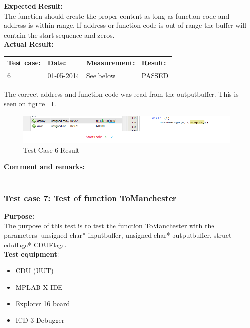 \textbf{Expected Result:}\\
The function should create the proper content as long as function code and address is within range. If address or function code is out of range the buffer will contain the start sequence and zeros.\\

\textbf{Actual Result:}\\
\begin{table}[H]
\centering
\begin{tabular}{|p{2cm}|p{2cm}|p{3cm}|p{2cm}|}\hline
\textbf{Test case:} & \textbf{Date:} & \textbf{Measurement:} & \textbf{Result:} \\ \hline
6 & 01-05-2014 & See below & PASSED \\ \hline
\end{tabular}
\end{table}
The correct address and function code was read from the outputbuffer. This is seen on figure ~\ref{fig:cdutestcase6}.\\
\begin{figure}[H]
\centering
\includegraphics[width=1\textwidth]{billeder/CDUtestcase6}
\caption{Test Case 6 Result}
\label{fig:cdutestcase6}
\end{figure}

\textbf{Comment and remarks:}\\
-\\

\subsubsection{Test case 7: Test of function ToManchester }
\textbf{Purpose:}\\
The purpose of this test is to test the function ToManchester with the parameters: unsigned char* inputbuffer, unsigned char* outputbuffer, struct cduflags* CDUFlags.\\

\textbf{Test equipment:}
\begin{itemize}
\item CDU (UUT)
\item MPLAB X IDE
\item Explorer 16 board
\item ICD 3 Debugger
\end{itemize}

